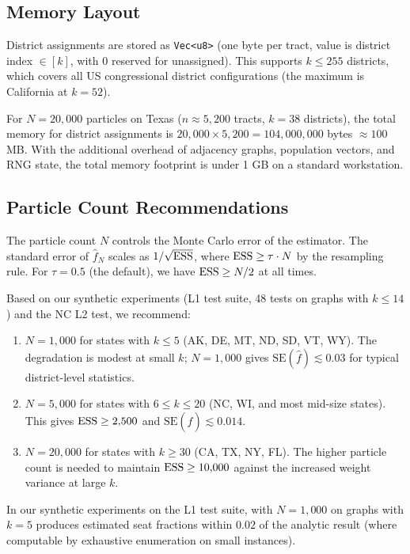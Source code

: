 \subsection{Memory Layout}

District assignments are stored as \texttt{Vec<u8>} (one byte per tract,
value is district index $\in [k]$, with 0 reserved for unassigned).
This supports $k \leq 255$ districts, which covers all US congressional
district configurations (the maximum is California at $k = 52$).

For $N = 20{,}000$ particles on Texas ($n \approx 5{,}200$ tracts, $k = 38$
districts), the total memory for district assignments is
$20{,}000 \times 5{,}200 = 104{,}000{,}000$ bytes $\approx 100$ MB.
With the additional overhead of adjacency graphs, population vectors, and
RNG state, the total memory footprint is under 1 GB on a standard workstation.

\subsection{Particle Count Recommendations}

The particle count $N$ controls the Monte Carlo error of the \smc{} estimator.
The standard error of $\hat{f}_N$ scales as $1/\sqrt{\mathrm{ESS}}$, where
$\mathrm{ESS} \geq \tau \cdot N$ by the resampling rule.
For $\tau = 0.5$ (the default), we have $\mathrm{ESS} \geq N/2$ at all times.

Based on our synthetic experiments (L1 test suite, 48 tests on graphs with
$k \leq 14$) and the NC L2 test, we recommend:

\begin{enumerate}
  \item $N = 1{,}000$ for states with $k \leq 5$ (AK, DE, MT, ND, SD, VT, WY).
        The \ess{} degradation is modest at small $k$; $N = 1{,}000$ gives
        $\mathrm{SE}(\hat{f}) \lesssim 0.03$ for typical district-level statistics.
  \item $N = 5{,}000$ for states with $6 \leq k \leq 20$ (NC, WI, and
        most mid-size states).
        This gives $\mathrm{ESS} \geq 2{,}500$ and $\mathrm{SE}(\hat{f}) \lesssim 0.014$.
  \item $N = 20{,}000$ for states with $k \geq 30$ (CA, TX, NY, FL).
        The higher particle count is needed to maintain $\mathrm{ESS} \geq 10{,}000$
        against the increased weight variance at large $k$.
\end{enumerate}

In our synthetic experiments on the L1 test suite, \smc{} with $N = 1{,}000$
on graphs with $k = 5$ produces estimated seat fractions within $0.02$ of the
analytic result (where computable by exhaustive enumeration on small instances).


